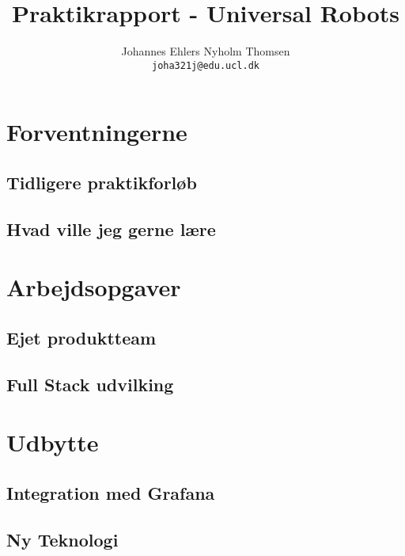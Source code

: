 \documentclass[a4paper]{article}
\title{Praktikrapport - Universal Robots}
\author
{
    Johannes Ehlers Nyholm Thomsen\\ 
    \texttt{joha321j@edu.ucl.dk}
}
\begin{document}
\maketitle

\newpage

\tableofcontents

\newpage

\section{Forventningerne}
\subsection{Tidligere praktikforløb}
\subsection{Hvad ville jeg gerne lære}

\section{Arbejdsopgaver}
\subsection{Ejet produktteam}
\subsection{Full Stack udvilking}

\section{Udbytte}
\subsection{Integration med Grafana}
\subsection{Ny Teknologi}
\end{document}
